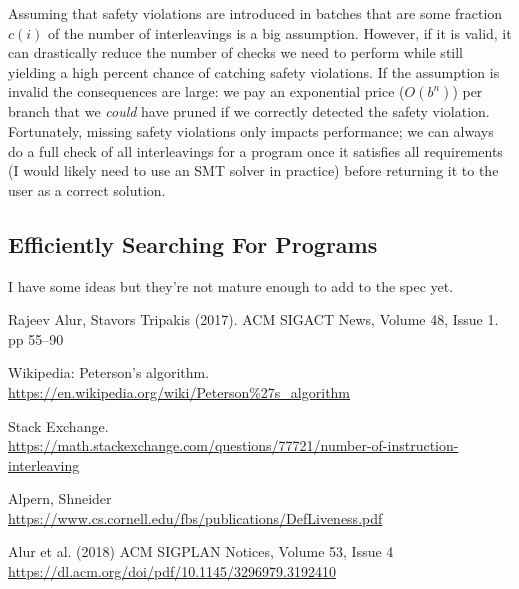 \documentclass[12pt]{article}
\begin{document}
Assuming that safety violations are introduced in batches that are some fraction $c(i)$ of the number of interleavings is a big assumption.  However, if it is valid, it can drastically reduce the number of checks we need to perform while still yielding a high percent chance of catching safety violations.  If the assumption is invalid the consequences are large: we pay an exponential price ($O(b^n)$) per branch that we \textit{could} have pruned if we correctly detected the safety violation.  Fortunately, missing safety violations only impacts performance; we can always do a full check of all interleavings for a program once it satisfies all requirements (I would likely need to use an SMT solver in practice) before returning it to the user as a correct solution.  


\subsection{Efficiently Searching For Programs}
I have some ideas but they're not mature enough to add to the spec yet.  


\begin{thebibliography}{9}
Rajeev Alur, Stavors Tripakis (2017).  ACM SIGACT News, Volume 48, Issue 1.  pp 55–90

Wikipedia: Peterson's algorithm.  \url{https://en.wikipedia.org/wiki/Peterson\%27s_algorithm}

Stack Exchange.  \\ \url{https://math.stackexchange.com/questions/77721/number-of-instruction-interleaving}

Alpern, Shneider  \\ \url{https://www.cs.cornell.edu/fbs/publications/DefLiveness.pdf}

Alur et al. (2018) ACM SIGPLAN Notices, Volume 53, Issue 4  \\ \url{https://dl.acm.org/doi/pdf/10.1145/3296979.3192410}
\end{thebibliography}
\end{document}

